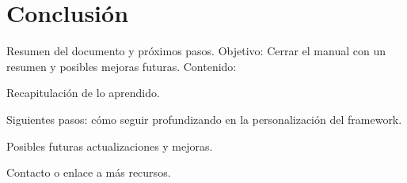 \section{Conclusión}
Resumen del documento y próximos pasos.
 Objetivo: Cerrar el manual con un resumen y posibles mejoras futuras.
 Contenido:

Recapitulación de lo aprendido.

Siguientes pasos: cómo seguir profundizando en la personalización del framework.

Posibles futuras actualizaciones y mejoras.

Contacto o enlace a más recursos.

